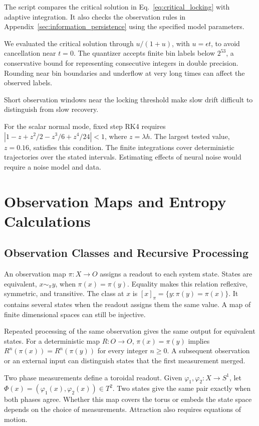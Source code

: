 \documentclass[12pt,a4paper]{article}
\begin{document}
The script  compares the critical solution in Eq.~\eqref{eq:critical_locking} with adaptive integration. It also checks the observation rules in Appendix~\ref{sec:information_persistence} using the specified model parameters.

We evaluated the critical solution through $u/(1+u)$, with $u=\epsilon t$, to avoid cancellation near $t=0$. The quantizer accepts finite bin labels below $2^{53}$, a conservative bound for representing consecutive integers in double precision. Rounding near bin boundaries and underflow at very long times can affect the observed labels.

Short observation windows near the locking threshold make slow drift difficult to distinguish from slow recovery.

For the scalar normal mode, fixed step RK4 requires $|1-z+z^2/2-z^3/6+z^4/24|<1$, where $z=\lambda h$. The largest tested value, $z=0.16$, satisfies this condition. The finite integrations cover deterministic trajectories over the stated intervals. Estimating effects of neural noise would require a noise model and data.

\section{Observation Maps and Entropy Calculations}\label{sec:observation}

\subsection{Observation Classes and Recursive Processing}

An observation map $\pi:X\to O$ assigns a readout to each system state. States are equivalent, $x\sim_\pi y$, when $\pi(x)=\pi(y)$. Equality makes this relation reflexive, symmetric, and transitive. The class at $x$ is $[x]_\pi=\{y:\pi(y)=\pi(x)\}$. It contains several states when the readout assigns them the same value. A map of finite dimensional spaces can still be injective.

Repeated processing of the same observation gives the same output for equivalent states. For a deterministic map $R:O\to O$, $\pi(x)=\pi(y)$ implies $R^n(\pi(x))=R^n(\pi(y))$ for every integer $n\geq0$. A subsequent observation or an external input can distinguish states that the first measurement merged.

Two phase measurements define a toroidal readout. Given $\varphi_1,\varphi_2:X\to S^1$, let $\Phi(x)=(\varphi_1(x),\varphi_2(x))\in T^2$. Two states give the same pair exactly when both phases agree. Whether this map covers the torus or embeds the state space depends on the choice of measurements. Attraction also requires equations of motion.
\end{document}
